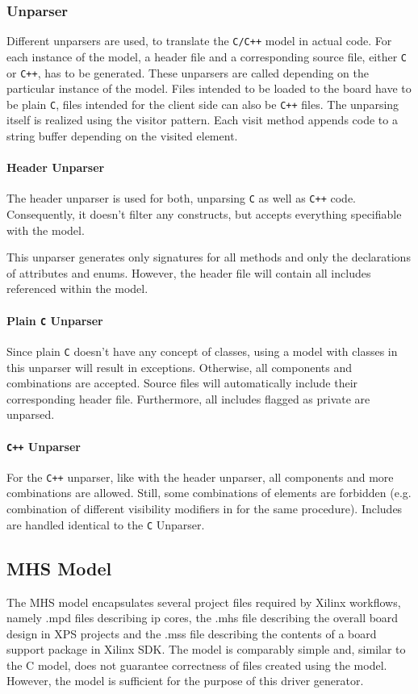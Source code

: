 \documentclass{report}
\begin{document}
\subsubsection{Unparser}
\label{sec:gen:unparser}
Different unparsers are used, to translate the \texttt{C/C++} model in actual code. For each instance of the model, a header file and a corresponding source file, either \texttt{C} or \texttt{C++}, has to be generated. These unparsers are called depending on the particular instance of the model. Files intended to be loaded to the board have to be plain \texttt{C}, files intended for the client side can also be \texttt{C++} files. The unparsing itself is realized using the visitor pattern. Each visit method appends code to a string buffer depending on the visited element.

\paragraph{Header Unparser}
The header unparser is used for both, unparsing \texttt{C} as well as \texttt{C++} code. Consequently, it doesn't filter any constructs, but accepts everything specifiable with the model.

This unparser generates only signatures for all methods and only the declarations of attributes and enums. However, the header file will contain all includes referenced within the model.

\paragraph{Plain \texttt{C} Unparser}
Since plain \texttt{C} doesn't have any concept of classes, using a model with classes in this unparser will result in exceptions. Otherwise, all components and combinations are accepted. Source files will automatically include their corresponding header file. Furthermore, all includes flagged as private are unparsed.

\paragraph{\texttt{C++} Unparser}
For the \texttt{C++} unparser, like with the header unparser, all components and more combinations are allowed. Still, some combinations of elements are forbidden (e.g. combination of different visibility modifiers in for the same procedure). Includes are handled identical to the \texttt{C} Unparser.

\subsection{MHS Model}
The MHS model encapsulates several project files required by Xilinx workflows, namely .mpd files describing ip cores, the .mhs file describing the overall board design in XPS projects and the .mss file describing the contents of a board support package in Xilinx SDK.
The model is comparably simple and, similar to the C model, does not guarantee correctness of files created using the model. However, the model is sufficient for the purpose of this driver generator.
\end{document}
